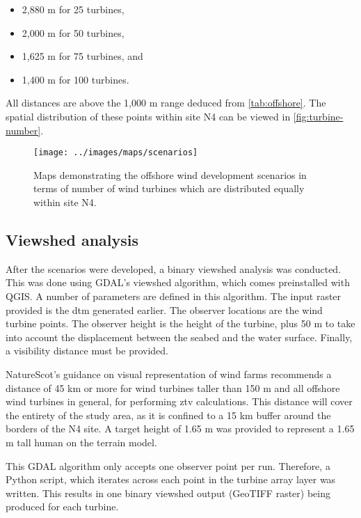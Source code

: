 \begin{itemize}[noitemsep]
  \item 2,880 m for 25 turbines,
  \item 2,000 m for 50 turbines,
  \item 1,625 m for 75 turbines, and
  \item 1,400 m for 100 turbines.
\end{itemize}

All distances are above the 1,000 m range deduced from \autoref{tab:offshore}. The spatial distribution of these points within site N4 can be viewed in \autoref{fig:turbine-number}.

\begin{figure}
  \centering
  \texttt{[image: ../images/maps/scenarios]}
  \caption{Maps demonstrating the offshore wind development scenarios in terms of number of wind turbines which are distributed equally within site N4. \label{fig:turbine-number}}
\end{figure}

\subsection{Viewshed analysis}

After the scenarios were developed, a binary viewshed analysis was conducted. This was done using GDAL's viewshed algorithm, which comes preinstalled with QGIS. A number of parameters are defined in this algorithm. The input raster provided is the \gls{dtm} generated earlier. The observer locations are the wind turbine points. The observer height is the height of the turbine, plus 50 m to take into account the displacement between the seabed and the water surface. Finally, a visibility distance must be provided.

NatureScot's guidance on visual representation of wind farms \autocite{naturescot-visual} recommends a distance of 45 km or more for wind turbines taller than 150 m and all offshore wind turbines in general, for performing \gls{ztv} calculations. This distance will cover the entirety of the study area, as it is confined to a 15 km buffer around the borders of the N4 site. A target height of 1.65 m was provided to represent a 1.65 m tall human on the terrain model.

This GDAL algorithm only accepts one observer point per run. Therefore, a Python script, which iterates across each point in the turbine array layer was written. This results in one binary viewshed output (GeoTIFF raster) being produced for each turbine.

